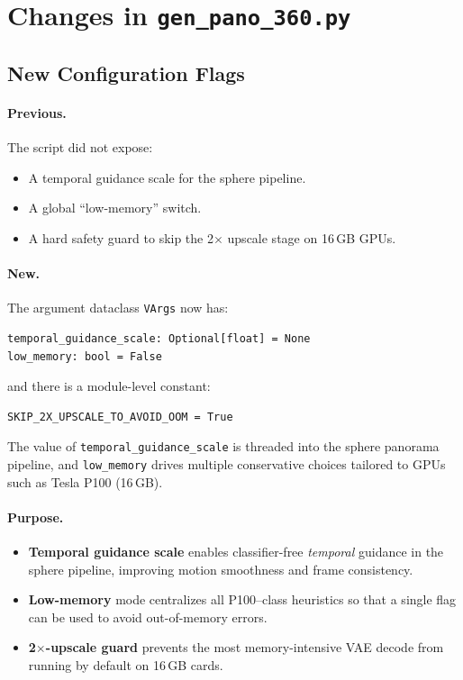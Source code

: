 \documentclass[11pt,a4paper]{article}
\newcommand{\file}[1]{\texttt{#1}}
\newcommand{\fn}[1]{\texttt{#1}}
\begin{document}
\section{Changes in \file{gen\_pano\_360.py}}

\subsection{New Configuration Flags}

\paragraph{Previous.}
The script did not expose:
\begin{itemize}[nosep]
    \item A temporal guidance scale for the sphere pipeline.
    \item A global ``low-memory'' switch.
    \item A hard safety guard to skip the 2$\times$ upscale stage on 16\,GB GPUs.
\end{itemize}

\paragraph{New.}
The argument dataclass \fn{VArgs} now has:
\begin{lstlisting}
temporal_guidance_scale: Optional[float] = None
low_memory: bool = False
\end{lstlisting}
and there is a module-level constant:
\begin{lstlisting}
SKIP_2X_UPSCALE_TO_AVOID_OOM = True
\end{lstlisting}
The value of \fn{temporal_guidance_scale} is threaded into the sphere panorama pipeline, and \fn{low\_memory} drives multiple conservative choices tailored to GPUs such as Tesla P100 (16\,GB).

\paragraph{Purpose.}
\begin{itemize}
    \item \textbf{Temporal guidance scale} enables classifier-free \emph{temporal} guidance in the sphere pipeline, improving motion smoothness and frame consistency.
    \item \textbf{Low-memory} mode centralizes all P100--class heuristics so that a single flag can be used to avoid out-of-memory errors.
    \item \textbf{2$\times$-upscale guard} prevents the most memory-intensive VAE decode from running by default on 16\,GB cards.
\end{itemize}
\end{document}
